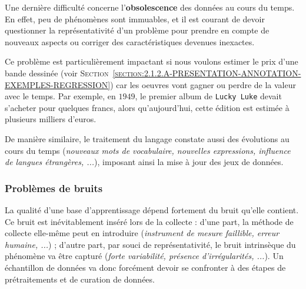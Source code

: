 			Une dernière difficulté concerne l'\textbf{obsolescence} des données au cours du temps.
			En effet, peu de phénomènes sont immuables, et il est courant de devoir questionner la représentativité d'un problème pour prendre en compte de nouveaux aspects ou corriger des caractéristiques devenues inexactes.
			\begin{leftBarExamples}
				Ce problème est particulièrement impactant si nous voulons estimer le prix d'une bande dessinée (voir \textsc{Section~\ref{section:2.1.2.A-PRESENTATION-ANNOTATION-EXEMPLES-REGRESSION}}) car les oeuvres vont gagner ou perdre de la valeur avec le temps.
				Par exemple, en $1949$, le premier album de \texttt{Lucky Luke} devait s'acheter pour quelques francs, alors qu'aujourd'hui, cette édition est estimée à plusieurs milliers d'euros.
				
				De manière similaire, le traitement du langage constate aussi des évolutions au cours du temps (\textit{nouveaux mots de vocabulaire, nouvelles expressions, influence de langues étrangères, ...}), imposant ainsi la mise à jour des jeux de données.
			\end{leftBarExamples}
		
		
		\subsubsection{Problèmes de bruits}
		\label{section:2.3.1.B-DEFIS-ANNOTATION-ASPECT-DONNEES-BRUITS}
		
			La qualité d'une base d'apprentissage dépend fortement du bruit qu'elle contient.
			Ce bruit est inévitablement inséré lors de la collecte :
			d'une part, la méthode de collecte elle-même peut en introduire (\textit{instrument de mesure faillible, erreur humaine, ...}) ;
			d'autre part, par souci de représentativité, le bruit intrinsèque du phénomène va être capturé (\textit{forte variabilité, présence d'irrégularités, ...}).
			Un échantillon de données va donc forcément devoir se confronter à des étapes de prétraitements et de curation de données.

